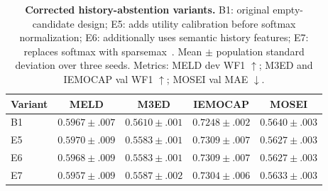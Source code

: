 \documentclass[10pt,twocolumn,letterpaper]{article}
\begin{document}
\begin{table}[h]
  \centering
  \caption{\textbf{Corrected history-abstention variants.}
  B1: original empty-candidate design; E5: adds utility calibration before softmax normalization; E6: additionally uses semantic history features; E7: replaces softmax with sparsemax~\cite{martins2016sparsemax}.
  Mean $\pm$ population standard deviation over three seeds. Metrics: MELD dev WF1 $\uparrow$; M3ED and IEMOCAP val WF1 $\uparrow$; MOSEI val MAE $\downarrow$.}
  \label{tab:abstain}
  \scriptsize
  \setlength{\tabcolsep}{4pt}
  \begin{tabular}{lcccc}
    \toprule
    Variant & MELD & M3ED & IEMOCAP & MOSEI \\
    \midrule
    B1 & $0.5967{\pm}.007$ & $0.5610{\pm}.001$ & $0.7248{\pm}.002$ & $0.5640{\pm}.003$ \\
    E5 & $0.5970{\pm}.009$ & $0.5583{\pm}.001$ & $0.7309{\pm}.007$ & $0.5627{\pm}.003$ \\
    E6 & $0.5968{\pm}.009$ & $0.5583{\pm}.001$ & $0.7309{\pm}.007$ & $0.5627{\pm}.003$ \\
    E7 & $0.5957{\pm}.009$ & $0.5587{\pm}.002$ & $0.7304{\pm}.006$ & $0.5633{\pm}.003$ \\
    \bottomrule
  \end{tabular}
\end{table}

\begin{table}[h]
  \centering
  \caption{\textbf{Four-dataset controlled matrix (ten seeds, valid selection, model6 feature stack).}
  Mean $\pm$ SD of valid WF1 (\%, $\uparrow$) for M3ED/MELD/IEMOCAP and valid MAE ($\downarrow$) for MOSEI.
  B0 = uniform weights without history; solo = evidence router with solo-weighted deployment.
  Paired seed-level results for solo: $+1.50$ pp vs B0 on M3ED (10/10, $p{=}0.002$); $+0.75$ pp vs uniform-history on MELD (10/10, $p{=}0.002$); $+1.20$ pp vs B0 on IEMOCAP (10/10, $p{=}0.002$); best mean MAE on MOSEI (8/10).}
  \label{tab:matrix4}
  \scriptsize
  \setlength{\tabcolsep}{3.5pt}
\end{table}
\end{document}
